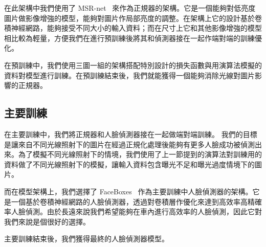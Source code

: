 在此架構中我們使用了 MSR-net~\cite{shen2017msr} 來作為正規器的架構。它是一個能夠對低亮度圖片做影像增強的模型，能夠對圖片作局部亮度的調整。在架構上它的設計基於卷積神經網路，能夠接受不同大小的輸入資料；而在尺寸上它和其他影像增強的模型相比較為輕量，方便我們在進行預訓練後將其和偵測器接在一起作端對端的訓練優化。

在預訓練中，我們使用三圖一組的架構搭配特別設計的損失函數與用演算法模擬的資料對模型進行訓練。在預訓練結束後，我們就能獲得一個能夠消除光線對圖片影響的正規器。

\subsection{主要訓練}

在主要訓練中，我們將正規器和人臉偵測器接在一起做端對端訓練。
我們的目標是讓來自不同光線照射下的圖片在經過正規化處理後能夠有更多人臉成功被偵測出來。為了模擬不同光線照射下的情境，我們使用了上一節提到的演算法對訓練用的資料做了不同光線照射下的模擬，讓輸入資料包含曝光不足和曝光過度情境下的圖片。

而在模型架構上，我們選擇了 FaceBoxes~\cite{zhang2017faceboxes} 作為主要訓練中人臉偵測器的架構。它是一個基於卷積神經網路的人臉偵測器，透過對卷積層作優化來達到高效率高精確率人臉偵測。由於長遠來說我們希望能夠在車內進行高效率的人臉偵測，因此它對我們來說是個很好的選擇。

主要訓練結束後，我們獲得最終的人臉偵測器模型。